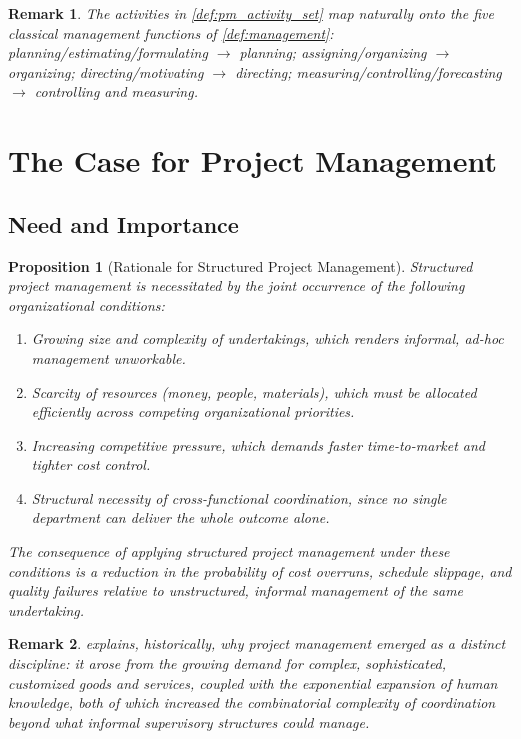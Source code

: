 \documentclass[12pt, a4paper]{report}
\theoremstyle{engnotes}
\newtheorem{prop}{Proposition}[section]
\newtheorem{remark}{Remark}[section]
\begin{document}
\begin{remark}
    The activities in \cref{def:pm_activity_set} map naturally onto the five classical management functions of \cref{def:management}: planning/estimating/formulating $\to$ planning; assigning/organizing $\to$ organizing; directing/motivating $\to$ directing; measuring/controlling/forecasting $\to$ controlling and measuring.
\end{remark}

\section{The Case for Project Management}
\label{sec:case_for_pm}

\subsection{Need and Importance}
\label{subsec:need_importance}

\begin{prop}[Rationale for Structured Project Management]\label{prop:rationale_pm}
    Structured project management is necessitated by the joint occurrence of the following organizational conditions:
    \begin{enumerate}
        \item Growing size and complexity of undertakings, which renders informal, ad-hoc management unworkable.
        \item Scarcity of resources (money, people, materials), which must be allocated efficiently across competing organizational priorities.
        \item Increasing competitive pressure, which demands faster time-to-market and tighter cost control.
        \item Structural necessity of cross-functional coordination, since no single department can deliver the whole outcome alone.
    \end{enumerate}
    The consequence of applying structured project management under these conditions is a reduction in the probability of cost overruns, schedule slippage, and quality failures relative to unstructured, informal management of the same undertaking.
\end{prop}

\begin{remark}
     explains, historically, \emph{why} project management emerged as a distinct discipline: it arose from the growing demand for complex, sophisticated, customized goods and services, coupled with the exponential expansion of human knowledge, both of which increased the combinatorial complexity of coordination beyond what informal supervisory structures could manage.
\end{remark}
\end{document}
